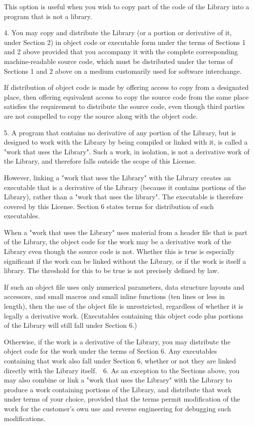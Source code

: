 \documentclass[a4paper,twoside,12pt]{book}
\begin{document}
  This option is useful when you wish to copy part of the code of
the Library into a program that is not a library.

  4. You may copy and distribute the Library (or a portion or
derivative of it, under Section 2) in object code or executable form
under the terms of Sections 1 and 2 above provided that you accompany
it with the complete corresponding machine-readable source code, which
must be distributed under the terms of Sections 1 and 2 above on a
medium customarily used for software interchange.

  If distribution of object code is made by offering access to copy
from a designated place, then offering equivalent access to copy the
source code from the same place satisfies the requirement to
distribute the source code, even though third parties are not
compelled to copy the source along with the object code.

  5. A program that contains no derivative of any portion of the
Library, but is designed to work with the Library by being compiled or
linked with it, is called a "work that uses the Library".  Such a
work, in isolation, is not a derivative work of the Library, and
therefore falls outside the scope of this License.

  However, linking a "work that uses the Library" with the Library
creates an executable that is a derivative of the Library (because it
contains portions of the Library), rather than a "work that uses the
library".  The executable is therefore covered by this License.
Section 6 states terms for distribution of such executables.

  When a "work that uses the Library" uses material from a header file
that is part of the Library, the object code for the work may be a
derivative work of the Library even though the source code is not.
Whether this is true is especially significant if the work can be
linked without the Library, or if the work is itself a library.  The
threshold for this to be true is not precisely defined by law.

  If such an object file uses only numerical parameters, data
structure layouts and accessors, and small macros and small inline
functions (ten lines or less in length), then the use of the object
file is unrestricted, regardless of whether it is legally a derivative
work.  (Executables containing this object code plus portions of the
Library will still fall under Section 6.)

  Otherwise, if the work is a derivative of the Library, you may
distribute the object code for the work under the terms of Section 6.
Any executables containing that work also fall under Section 6,
whether or not they are linked directly with the Library itself.

  6. As an exception to the Sections above, you may also combine or
link a "work that uses the Library" with the Library to produce a
work containing portions of the Library, and distribute that work
under terms of your choice, provided that the terms permit
modification of the work for the customer's own use and reverse
engineering for debugging such modifications.
\end{document}
